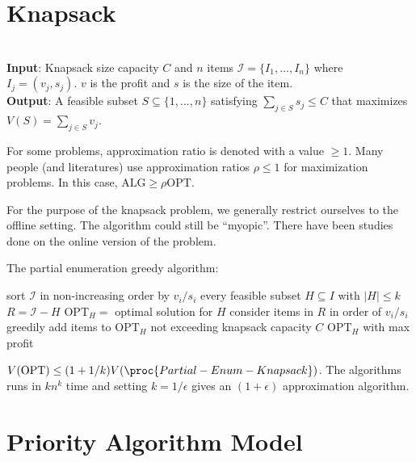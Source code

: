 \section{Knapsack}

\begin{definition}
    \hfill \\
    \textbf{Input}: Knapsack size capacity $C$ and $n$ items $\mathcal{I} = \{I_1,\ldots,I_n\}$ where $I_j = (v_j,s_j)$. $v$ is the profit and $s$ is the size of the item. \\
    \textbf{Output}: A feasible subset $S \subseteq \{1,\ldots,n\}$ satisfying $\sum_{j \in S} s_j \leq C$ that maximizes $V(S) = \sum_{j\in S} v_j$.
\end{definition}

For some problems, approximation ratio is denoted with a value $\geq 1$. Many people (and literatures) use approximation ratios $\rho \leq 1$ for maximization problems. In this case, $\mathrm{ALG} \geq \rho \mathrm{OPT}$.

For the purpose of the knapsack problem, we generally restrict ourselves to the offline setting. The algorithm could still be ``myopic''. There have been studies done on the online version of the problem.

The partial enumeration greedy algorithm:

\begin{codebox}
    \li sort $\mathcal{I}$ in non-increasing order by $v_i/s_i$
    \li \For every feasible subset $H \subseteq I$ with $|H| \leq k$ \Do
        \li $R = \mathcal{I} - H$
        \li $\mathrm{OPT}_H =$ optimal solution for $H$
        \li consider items in $R$ in order of $v_i/s_i$
        \li greedily add items to $\mathrm{OPT}_H$ not exceeding knapsack capacity $C$
    \End
    \li \Return $\mathrm{OPT}_H$ with max profit
\end{codebox}

\begin{theorem}[Sahni 1975]
    $V(\mathrm{OPT}) \leq (1+1/k)V(\proc{Partial-Enum-Knapsack})$. The algorithms runs in $kn^k$ time and setting $k=1/\epsilon$ gives an $(1+\epsilon)$ approximation algorithm.
\end{theorem}

\section{Priority Algorithm Model}

